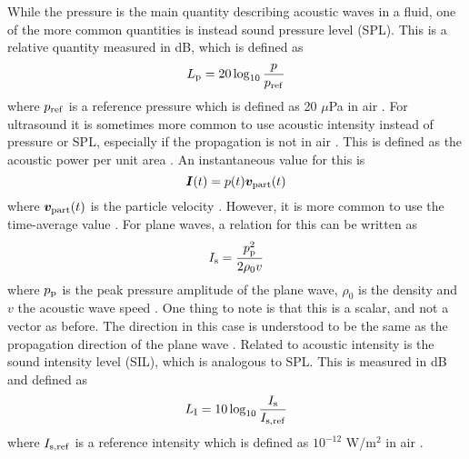 \documentclass[11pt,twoside]{eitExjobb}
\begin{document}
	While the pressure is the main quantity describing acoustic waves in a fluid, one of the more common quantities is instead sound pressure level (SPL). This is a relative quantity measured in dB, which is defined as
	\begin{equation*}
		L_{\mathrm{p}} = 20 \log_{10}{\frac{p}{p_{\mathrm{ref}}}}
	\end{equation*}
	where $p_{\mathrm{ref}}$ is a reference pressure which is defined as 20 $\mu$Pa in air \cite{Rossing2014}. For ultrasound it is sometimes more common to use acoustic intensity instead of pressure or SPL, especially if the propagation is not in air \addref. This is defined as the acoustic power per unit area \cite{Rossing2014}. An instantaneous value for this is
	\begin{equation*}
		\bm{I}(t) = p(t) \bm{v}_{\mathrm{part}}(t)
	\end{equation*}
	where $\bm{v}_{\mathrm{part}}(t)$ is the particle velocity \cite{Rossing2014}. However, it is more common to use the time-average value \cite{Jacobsen1991}. For plane waves, a relation for this can be written as
	\begin{equation*}
		I_{\mathrm{s}} = \frac{p_{\mathrm{p}}^2}{2\rho_0 v}
	\end{equation*}
	where $p_{\mathrm{p}}$ is the peak pressure amplitude of the plane wave, $\rho_0$ is the density and $v$ the acoustic wave speed \cite{Rossing2014}. One thing to note is that this is a scalar, and not a vector as before. The direction in this case is understood to be the same as the propagation direction of the plane wave \cite{Rossing2014}. Related to acoustic intensity is the sound intensity level (SIL), which is analogous to SPL. This is measured in dB and defined as
	\begin{equation*}
		L_{\mathrm{I}} = 10 \log_{10}{\frac{I_{\mathrm{s}}}{I_{\mathrm{s,ref}}}}
	\end{equation*}
	where $I_{\mathrm{s,ref}}$ is a reference intensity which is defined as $10^{-12}$ W/m$^2$ in air \cite{Rossing2014}.
	
\end{document}
